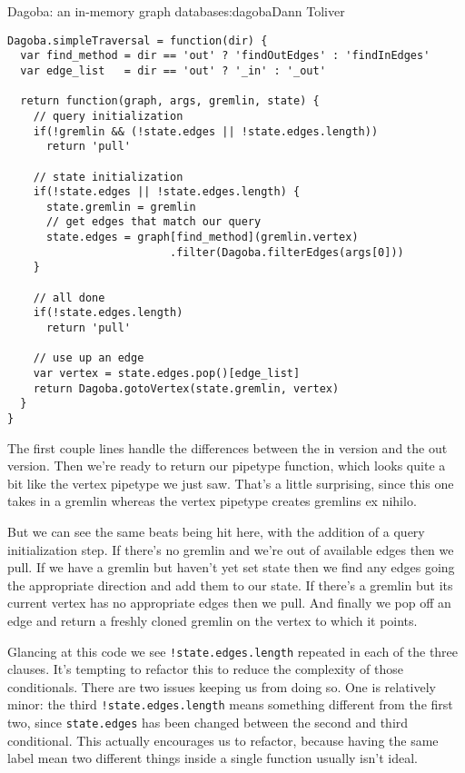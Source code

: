 \begin{aosachapter}{Dagoba: an in-memory graph database}{s:dagoba}{Dann Toliver}
\begin{verbatim}
Dagoba.simpleTraversal = function(dir) {
  var find_method = dir == 'out' ? 'findOutEdges' : 'findInEdges'
  var edge_list   = dir == 'out' ? '_in' : '_out'
  
  return function(graph, args, gremlin, state) {
    // query initialization
    if(!gremlin && (!state.edges || !state.edges.length))         
      return 'pull'
      
    // state initialization
    if(!state.edges || !state.edges.length) {                     
      state.gremlin = gremlin
      // get edges that match our query
      state.edges = graph[find_method](gremlin.vertex)            
                         .filter(Dagoba.filterEdges(args[0]))
    }

    // all done
    if(!state.edges.length)                                       
      return 'pull'
    
    // use up an edge
    var vertex = state.edges.pop()[edge_list]                     
    return Dagoba.gotoVertex(state.gremlin, vertex)
  }
}
\end{verbatim}

The first couple lines handle the differences between the in version and
the out version. Then we're ready to return our pipetype function, which
looks quite a bit like the vertex pipetype we just saw. That's a little
surprising, since this one takes in a gremlin whereas the vertex
pipetype creates gremlins ex nihilo.

But we can see the same beats being hit here, with the addition of a
query initialization step. If there's no gremlin and we're out of
available edges then we pull. If we have a gremlin but haven't yet set
state then we find any edges going the appropriate direction and add
them to our state. If there's a gremlin but its current vertex has no
appropriate edges then we pull. And finally we pop off an edge and
return a freshly cloned gremlin on the vertex to which it points.

Glancing at this code we see \texttt{!state.edges.length} repeated in
each of the three clauses. It's tempting to refactor this to reduce the
complexity of those conditionals. There are two issues keeping us from
doing so. One is relatively minor: the third
\texttt{!state.edges.length} means something different from the first
two, since \texttt{state.edges} has been changed between the second and
third conditional. This actually encourages us to refactor, because
having the same label mean two different things inside a single function
usually isn't ideal.


\end{aosachapter}
